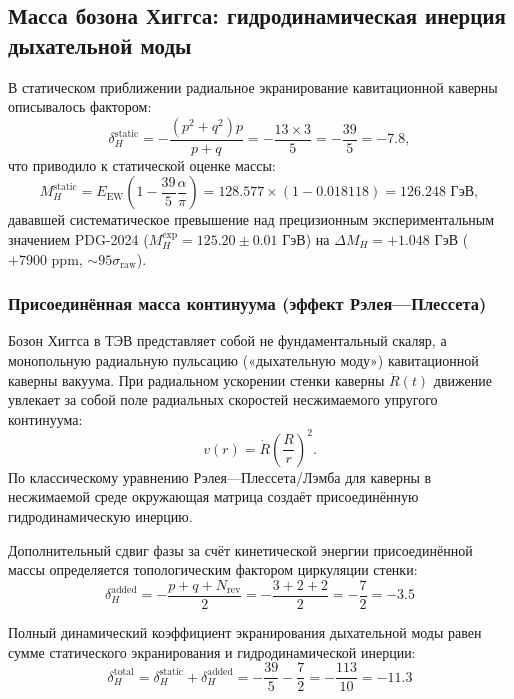 \documentclass[11pt,a4paper]{article}
\theoremstyle{definition}
\theoremstyle{remark}
\begin{document}
\subsection{Масса бозона Хиггса: гидродинамическая инерция дыхательной моды}
\label{subsec:higgs_breathing_resolution}

В статическом приближении радиальное экранирование кавитационной каверны описывалось фактором:
\begin{equation}
\delta_H^{\mathrm{static}} = -\frac{(p^2 + q^2) p}{p + q} = -\frac{13 \times 3}{5} = -\frac{39}{5} = -7.8,
\end{equation}
что приводило к статической оценке массы:
\begin{equation}
M_H^{\mathrm{static}} = E_{\mathrm{EW}} \left(1 - \frac{39}{5} \frac{\alpha}{\pi}\right) = 128.577 \times (1 - 0.018118) = 126.248 \text{ ГэВ},
\end{equation}
дававшей систематическое превышение над прецизионным экспериментальным значением PDG-2024 ($M_H^{\mathrm{exp}} = 125.20 \pm 0.01\text{ ГэВ}$) на $\Delta M_H = +1.048\text{ ГэВ}$ ($+7900\text{ ppm}$, $\sim 95\sigma_{\mathrm{raw}}$).

\subsubsection{Присоединённая масса континуума (эффект Рэлея---Плессета)}

Бозон Хиггса в ТЭВ представляет собой не фундаментальный скаляр, а монопольную радиальную пульсацию («дыхательную моду») кавитационной каверны вакуума. При радиальном ускорении стенки каверны $\ddot{R}(t)$ движение увлекает за собой поле радиальных скоростей несжимаемого упругого континуума:
\begin{equation}
v(r) = \dot{R} \left(\frac{R}{r}\right)^2.
\end{equation}
По классическому уравнению Рэлея---Плессета/Лэмба для каверны в несжимаемой среде окружающая матрица создаёт присоединённую гидродинамическую инерцию.

Дополнительный сдвиг фазы за счёт кинетической энергии присоединённой массы определяется топологическим фактором циркуляции стенки:
\begin{equation}
\delta_H^{\mathrm{added}} = -\frac{p + q + N_{\mathrm{rev}}}{2} = -\frac{3 + 2 + 2}{2} = -\frac{7}{2} = -3.5
\end{equation}

Полный динамический коэффициент экранирования дыхательной моды равен сумме статического экранирования и гидродинамической инерции:
\begin{equation}
\delta_H^{\mathrm{total}} = \delta_H^{\mathrm{static}} + \delta_H^{\mathrm{added}} = -\frac{39}{5} - \frac{7}{2} = -\frac{113}{10} = -11.3
\end{equation}
\end{document}
